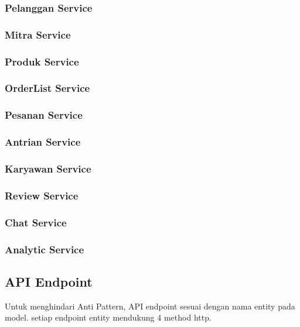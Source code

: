 \subsubsection{Pelanggan Service}
\subsubsection{Mitra Service}
\subsubsection{Produk Service}
\subsubsection{OrderList Service}
\subsubsection{Pesanan Service}
\subsubsection{Antrian Service}
\subsubsection{Karyawan Service}
\subsubsection{Review Service}
\subsubsection{Chat Service}
\subsubsection{Analytic Service}

\subsection{API Endpoint}
Untuk menghindari Anti Pattern, API endpoint sesuai dengan nama entity pada model.
setiap endpoint entity mendukung 4 method http.
